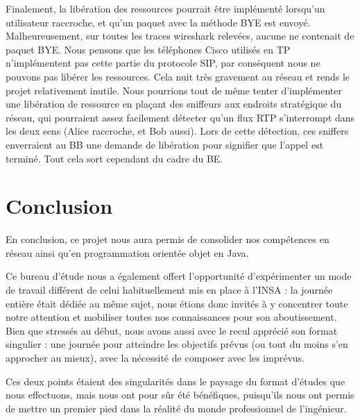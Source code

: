 \documentclass[a4paper,11pt]{article}
\let\Oldsection\section
\renewcommand{\section}{\FloatBarrier\Oldsection}
\begin{document}
Finalement, la libération des ressources pourrait être implémenté lorsqu’un utilisateur raccroche, et qu’un paquet avec la méthode BYE est envoyé. Malheureusement, sur toutes les traces wireshark relevées, aucune ne contenait de paquet BYE. Nous pensons que les téléphones Cisco utilisés en TP n'implémentent pas cette partie du protocole SIP, par conséquent nous ne pouvons pas libérer les ressources. Cela nuit très gravement au réseau et rends le projet relativement inutile. Nous pourrions tout de même tenter d’implémenter une libération de ressource en plaçant des sniffeurs aux endroits stratégique du réseau, qui pourraient assez facilement détecter qu’un flux RTP s’interrompt dans les deux sens (Alice raccroche, et Bob aussi). Lors de cette détection, ces sniffers enverraient au BB une demande de libération pour signifier que l’appel est terminé. Tout cela sort cependant du cadre du BE. 





\section{Conclusion}

En conclusion, ce projet nous aura permis de consolider nos compétences en réseau ainsi qu’en programmation orientée objet en Java. 

Ce bureau d'étude nous a également offert l’opportunité d’expérimenter un mode de travail différent de celui habituellement mis en place à l’INSA : la journée entière était dédiée au même sujet, nous étions donc invités à y concentrer toute notre attention et mobiliser toutes nos connaissances pour son aboutissement.
Bien que stressés au début, nous avons aussi avec le recul apprécié son format singulier : une journée pour atteindre les objectifs prévus (ou tout du moins s’en approcher au mieux), avec la nécessité de composer avec les imprévus. 

Ces deux points étaient des singularités dans le paysage du format d’études que nous effectuons, mais nous ont pour sûr été bénéfiques, puisqu’ils nous ont permis de mettre un premier pied dans la réalité du monde professionnel de l’ingénieur. 


\cleardoublepage
\listoflistings
\listoffigures
\end{document}
